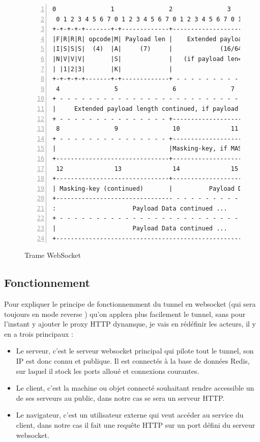 \begin{figure}[htp]
\centering
\begin{lstlisting}[gobble=0, numbers=left, frame=l,
  basewidth={0.55em, 0.4em}]
 0               1               2               3              
 0 1 2 3 4 5 6 7 0 1 2 3 4 5 6 7 0 1 2 3 4 5 6 7 0 1 2 3 4 5 6 7
+-+-+-+-+-------+-+-------------+-------------------------------+
|F|R|R|R| opcode|M| Payload len |    Extended payload length    |
|I|S|S|S|  (4)  |A|     (7)     |             (16/64)           |
|N|V|V|V|       |S|             |   (if payload len==126/127)   |
| |1|2|3|       |K|             |                               |
+-+-+-+-+-------+-+-------------+ - - - - - - - - - - - - - - - +
 4               5               6               7              
+ - - - - - - - - - - - - - - - - - - - - - - - - - - - - - - - +
|     Extended payload length continued, if payload len == 127  |
+ - - - - - - - - - - - - - - - +-------------------------------+
 8               9               10              11             
+ - - - - - - - - - - - - - - - +-------------------------------+
|                               |Masking-key, if MASK set to 1  |
+-------------------------------+-------------------------------+
 12              13              14              15
+-------------------------------+-------------------------------+
| Masking-key (continued)       |          Payload Data         |
+-------------------------------- - - - - - - - - - - - - - - - +
:                     Payload Data continued ...                :
+ - - - - - - - - - - - - - - - - - - - - - - - - - - - - - - - +
|                     Payload Data continued ...                |
+---------------------------------------------------------------+
\end{lstlisting}
\caption{Trame WebSocket}
\end{figure}

\subsection{Fonctionnement}

Pour expliquer le principe de fonctionnemment du tunnel en websocket (qui sera toujours en mode \og reverse \fg{}) qu'on applera plus facilement le tunnel, sans pour l'instant y ajouter le proxy HTTP dynamque, je vais en rédéfinir les acteurs, il y en a trois principaux :
\begin{itemize}
    \item Le serveur, c'est le serveur websocket principal qui pilote tout le tunnel, son IP est donc connu et publique. Il est connectés à la base de données Redis, sur laquel il stock les ports alloué et connexions courantes.
    \item Le client, c'est la machine ou objet connecté souhaitant rendre accessible un de ses serveurs au public, dans notre cas se sera un serveur HTTP.
    \item Le navigateur, c'est un utilisateur externe qui veut accéder au service du client, dans notre cas il fait une requête HTTP sur un port défini du serveur websocket. 
\end{itemize}

